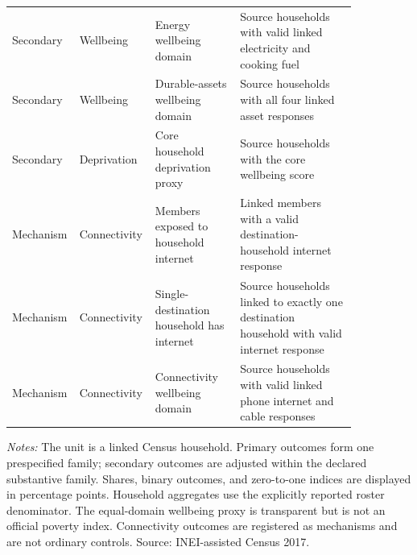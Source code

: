 \begin{longtable}{p{0.10\linewidth}p{0.18\linewidth}p{0.24\linewidth}p{0.33\linewidth}}
Secondary & Wellbeing & Energy wellbeing domain & Source households with valid linked electricity and cooking fuel \\
Secondary & Wellbeing & Durable-assets wellbeing domain & Source households with all four linked asset responses \\
Secondary & Deprivation & Core household deprivation proxy & Source households with the core wellbeing score \\
Mechanism & Connectivity & Members exposed to household internet & Linked members with a valid destination-household internet response \\
Mechanism & Connectivity & Single-destination household has internet & Source households linked to exactly one destination household with valid internet response \\
Mechanism & Connectivity & Connectivity wellbeing domain & Source households with valid linked phone internet and cable responses \\
\bottomrule
\end{longtable}
\begin{minipage}{0.98\linewidth}\footnotesize\textit{Notes:} The unit is a linked Census household. Primary outcomes form one prespecified family; secondary outcomes are adjusted within the declared substantive family. Shares, binary outcomes, and zero-to-one indices are displayed in percentage points. Household aggregates use the explicitly reported roster denominator. The equal-domain wellbeing proxy is transparent but is not an official poverty index. Connectivity outcomes are registered as mechanisms and are not ordinary controls. Source: INEI-assisted Census 2017.\end{minipage}
\endgroup
